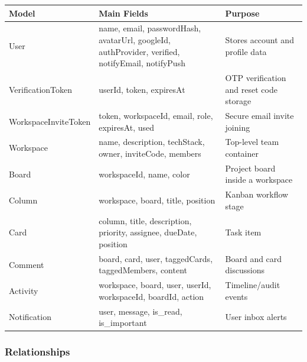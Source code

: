 \documentclass[
]{article}
\begin{document}
{\def\LTcaptype{} %
\begin{longtable}[]{@{}
  >{\raggedright\arraybackslash}p{}
  >{\raggedright\arraybackslash}p{}
  >{\raggedright\arraybackslash}p{}@{}}
\toprule\noalign{}
\begin{minipage}[b]{\linewidth}\raggedright
Model
\end{minipage} & \begin{minipage}[b]{\linewidth}\raggedright
Main Fields
\end{minipage} & \begin{minipage}[b]{\linewidth}\raggedright
Purpose
\end{minipage} \\
\midrule\noalign{}
\endhead
\bottomrule\noalign{}
\endlastfoot
User & name, email, passwordHash, avatarUrl, googleId, authProvider,
verified, notifyEmail, notifyPush & Stores account and profile data \\
VerificationToken & userId, token, expiresAt & OTP verification and
reset code storage \\
WorkspaceInviteToken & token, workspaceId, email, role, expiresAt, used
& Secure email invite joining \\
Workspace & name, description, techStack, owner, inviteCode, members &
Top-level team container \\
Board & workspaceId, name, color & Project board inside a workspace \\
Column & workspace, board, title, position & Kanban workflow stage \\
Card & column, title, description, priority, assignee, dueDate, position
& Task item \\
Comment & board, card, user, taggedCards, taggedMembers, content & Board
and card discussions \\
Activity & workspace, board, user, userId, workspaceId, boardId, action
& Timeline/audit events \\
Notification & user, message, is\_read, is\_important & User inbox
alerts \\
\end{longtable}
}

\subsubsection{Relationships}\label{relationships}
\end{document}
